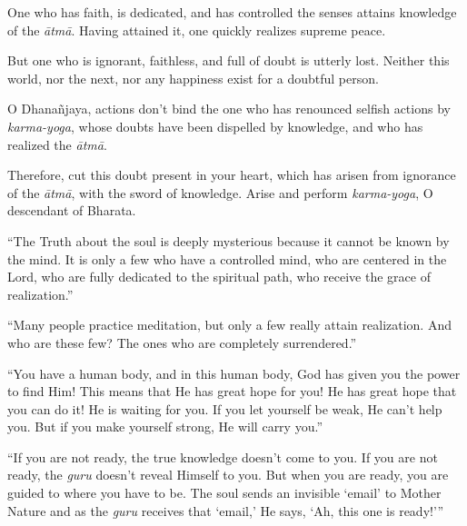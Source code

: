 {One who has faith, is dedicated, and has controlled the senses attains knowledge of the \textit{ātmā}. Having attained it, one quickly realizes supreme peace.}

{But one who is ignorant, faithless, and full of doubt is utterly lost. Neither this world, nor the next, nor any happiness exist for a doubtful person.}

{O Dhanañjaya, actions don't bind the one who has renounced selfish actions by \textit{karma-yoga}, whose doubts have been dispelled by knowledge, and who has realized the \textit{ātmā}.}

{Therefore, cut this doubt present in your heart, which has arisen from ignorance of the \textit{ātmā}, with the sword of knowledge. Arise and perform \textit{karma-yoga}, O descendant of Bharata.}

\enquote{The Truth about the soul is deeply mysterious because it cannot be known by the mind. It is only a few who have a controlled mind, who are centered in the Lord, who are fully dedicated to the spiritual path, who receive the grace of realization.}

\enquote{Many people practice meditation, but only a few really attain realization. And who are these few? The ones who are completely surrendered.}

\enquote{You have a human body, and in this human body, God has given you the power to find Him! This means that He has great hope for you! He has great hope that you can do it! He is waiting for you. If you let yourself be weak, He can’t help you. But if you make yourself strong, He will carry you.}

\enquote{If you are not ready, the true knowledge doesn’t come to you. If you are not ready, the \textit{guru} doesn’t reveal Himself to you. But when you are ready, you are guided to where you have to be. The soul sends an invisible \enquote{email} to Mother Nature and as the \textit{guru} receives that \enquote{email,} He says, \enquote{Ah, this one is ready!}}

